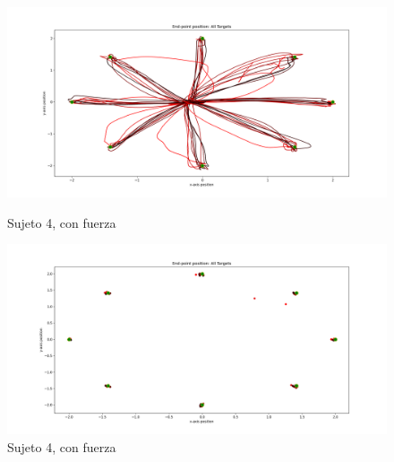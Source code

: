 \documentclass[a4paper,11pt, oneside]{book}
\begin{document}
\begin{figure}[H]
	\begin{minipage}[b]{0.5\linewidth}
		\centering
		\includegraphics[width=\linewidth]{sujeto4/force/trayectorias}
		\caption{Sujeto 4, con fuerza}
		\label{fig:figura1}
	\end{minipage}
	\hspace{0.5cm}
	\begin{minipage}[b]{0.5\linewidth}
		\centering
		\includegraphics[width=\linewidth]{sujeto4/force/trayectorias_puntos}
		\caption{Sujeto 4, con fuerza}
		\label{fig:figura2}
	\end{minipage}
\end{figure}
\end{document}
